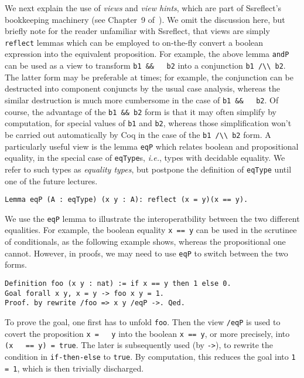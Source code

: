 \documentclass[blockstyle,preprint]{sigplanconf}
\newcommand{\is}[1]{\textcolor{blue}{(Ilya: {#1})}}
\newcommand{\an}[1]{\textcolor{red}{(Aleks: {#1})}}
\newcommand{\code}[1]{\lstinline{#1}}
\newcommand{\ie}{\emph{i.e.}\xspace}
\begin{document}
We next explain the use of \emph{views} and \emph{view hints}, which
are part of Ssreflect's bookkeeping machinery (see Chapter~9
of~\cite{Gonthier-al:TR}). We omit the discussion here, but briefly
note for the reader unfamiliar with Ssreflect, that views are simply
\code{reflect} lemmas which can be employed to on-the-fly convert a
boolean expression into the equivalent proposition. For example, the
above lemma \code{andP} can be used as a view to transform \code{b1 &&
  b2} into a conjunction \code{b1 /\\ b2}. The latter form may be
preferable at times; for example, the conjunction can be destructed
into component conjuncts by the usual case analysis, whereas the
similar destruction is much more cumbersome in the case of \code{b1 &&
  b2}. Of course, the advantage of the \code{b1 && b2} form is that it
may often simplify by computation, for special values of \code{b1} and
\code{b2}, whereas those simplification won't be carried out
automatically by Coq in the case of the \code{b1 /\\ b2} form.  A
particularly useful view is the lemma \code{eqP} which relates boolean
and propositional equality, in the special case of \code{eqType}s,
\ie, types with decidable equality. We refer to such types as
\emph{equality types}, but postpone the definition of \code{eqType}
until one of the future lectures.
\begin{lstlisting}
Lemma eqP (A : eqType) (x y : A): reflect (x = y)(x == y).
\end{lstlisting}
We use the \code{eqP} lemma to illustrate the interoperatbility
between the two different equalities. For example, the boolean
equality \code{x == y} can be used in the scrutinee of conditionals,
as the following example shows, whereas the propositional one
cannot. However, in proofs, we may need to use \code{eqP} to switch
between the two forms.
%
\begin{lstlisting}
Definition foo (x y : nat) := if x == y then 1 else 0.
Goal forall x y, x = y -> foo x y = 1.
Proof. by rewrite /foo => x y /eqP ->. Qed.
\end{lstlisting}
%
To prove the goal, one first has to unfold \code{foo}.
%
%
Then the view \code{/eqP} is used to covert the proposition \code{x =
  y} into the boolean \code{x == y}, or more precisely, into \code{(x
  == y) = true}.  The later is subsequently used (by \code{->}), to
rewrite the condition in \code{if-then-else} to \code{true}. By
computation, this reduces the goal into \code{1 = 1}, which is then
trivially discharged.
%
\end{document}
